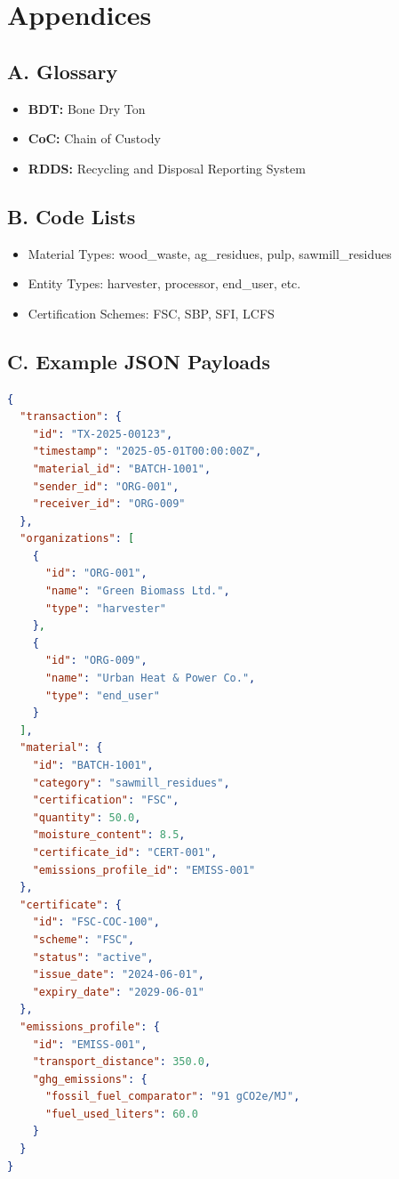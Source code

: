 \documentclass{article}
\begin{document}
\section{Appendices}
\subsection*{A. Glossary}
\begin{itemize}[noitemsep]
    \item \textbf{BDT:} Bone Dry Ton
    \item \textbf{CoC:} Chain of Custody
    \item \textbf{RDDS:} Recycling and Disposal Reporting System
\end{itemize}

\subsection*{B. Code Lists}
\begin{itemize}[noitemsep]
    \item Material Types: wood\_waste, ag\_residues, pulp, sawmill\_residues
    \item Entity Types: harvester, processor, end\_user, etc. 
    \item Certification Schemes: FSC, SBP, SFI, LCFS
\end{itemize}

\subsection*{C. Example JSON Payloads}
\begin{lstlisting}[language=json]
{
  "transaction": {
    "id": "TX-2025-00123",
    "timestamp": "2025-05-01T00:00:00Z",
    "material_id": "BATCH-1001",
    "sender_id": "ORG-001",
    "receiver_id": "ORG-009"
  },
  "organizations": [
    {
      "id": "ORG-001",
      "name": "Green Biomass Ltd.",
      "type": "harvester"
    },
    {
      "id": "ORG-009",
      "name": "Urban Heat & Power Co.",
      "type": "end_user"
    }
  ],
  "material": {
    "id": "BATCH-1001",
    "category": "sawmill_residues",
    "certification": "FSC",
    "quantity": 50.0,
    "moisture_content": 8.5,
    "certificate_id": "CERT-001",
    "emissions_profile_id": "EMISS-001"
  },
  "certificate": {
    "id": "FSC-COC-100",
    "scheme": "FSC",
    "status": "active",
    "issue_date": "2024-06-01",
    "expiry_date": "2029-06-01"
  },
  "emissions_profile": {
    "id": "EMISS-001",
    "transport_distance": 350.0,
    "ghg_emissions": {
      "fossil_fuel_comparator": "91 gCO2e/MJ",
      "fuel_used_liters": 60.0
    }
  }
}
\end{lstlisting}
\end{document}
